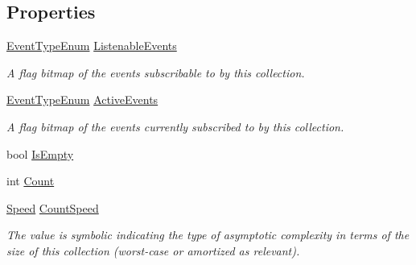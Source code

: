 \subsection*{Properties}
\begin{DoxyCompactItemize}
\item 
\hyperlink{namespace_c5_a9143bfd561fffa025d21561674758008}{Event\+Type\+Enum} \hyperlink{interface_c5_1_1_i_collection_value_ac19b17d9b2ca7f2717013e4a8076e481}{Listenable\+Events}
\begin{DoxyCompactList}\small\item\em A flag bitmap of the events subscribable to by this collection. \end{DoxyCompactList}\item 
\hyperlink{namespace_c5_a9143bfd561fffa025d21561674758008}{Event\+Type\+Enum} \hyperlink{interface_c5_1_1_i_collection_value_a255e04159eaa809e157ce453dc4b2340}{Active\+Events}
\begin{DoxyCompactList}\small\item\em A flag bitmap of the events currently subscribed to by this collection. \end{DoxyCompactList}\item 
bool \hyperlink{interface_c5_1_1_i_collection_value_af731142c68c50403553a545318dcae01}{Is\+Empty}
\item 
int \hyperlink{interface_c5_1_1_i_collection_value_ac02f774c320d7e93e3020ac124de5c96}{Count}
\item 
\hyperlink{namespace_c5_a615ba88dcdaa8d5a3c5f833a73d7fad6}{Speed} \hyperlink{interface_c5_1_1_i_collection_value_aeaf5f215b7f6b1b3aec0a8cd939ea1a9}{Count\+Speed}
\begin{DoxyCompactList}\small\item\em The value is symbolic indicating the type of asymptotic complexity in terms of the size of this collection (worst-\/case or amortized as relevant). \end{DoxyCompactList}\end{DoxyCompactItemize}
